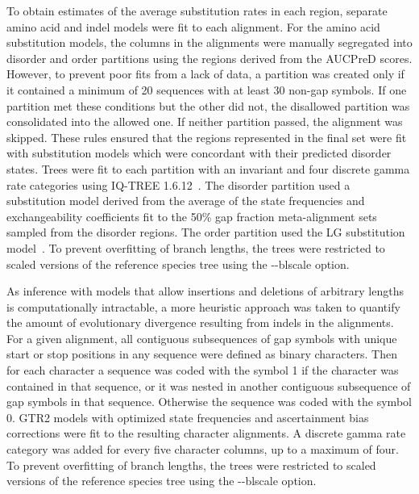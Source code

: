 To obtain estimates of the average substitution rates in each region, separate amino acid and indel models were fit to each alignment. For the amino acid substitution models, the columns in the alignments were manually segregated into disorder and order partitions using the regions derived from the AUCPreD scores. However, to prevent poor fits from a lack of data, a partition was created only if it contained a minimum of 20 sequences with at least 30 non-gap symbols. If one partition met these conditions but the other did not, the disallowed partition was consolidated into the allowed one. If neither partition passed, the alignment was skipped. These rules ensured that the regions represented in the final set were fit with substitution models which were concordant with their predicted disorder states. Trees were fit to each partition with an invariant and four discrete gamma rate categories using IQ-TREE 1.6.12~\cite{Yang1994}. The disorder partition used a substitution model derived from the average of the state frequencies and exchangeability coefficients fit to the 50\% gap fraction meta-alignment sets sampled from the disorder regions. The order partition used the LG substitution model~\cite{Le2008}. To prevent overfitting of branch lengths, the trees were restricted to scaled versions of the reference species tree using the -{}-blscale option.

As inference with models that allow insertions and deletions of arbitrary lengths is computationally intractable, a more heuristic approach was taken to quantify the amount of evolutionary divergence resulting from indels in the alignments. For a given alignment, all contiguous subsequences of gap symbols with unique start or stop positions in any sequence were defined as binary characters. Then for each character a sequence was coded with the symbol 1 if the character was contained in that sequence, or it was nested in another contiguous subsequence of gap symbols in that sequence. Otherwise the sequence was coded with the symbol 0. GTR2 models with optimized state frequencies and ascertainment bias corrections were fit to the resulting character alignments. A discrete gamma rate category was added for every five character columns, up to a maximum of four. To prevent overfitting of branch lengths, the trees were restricted to scaled versions of the reference species tree using the -{}-blscale option.

